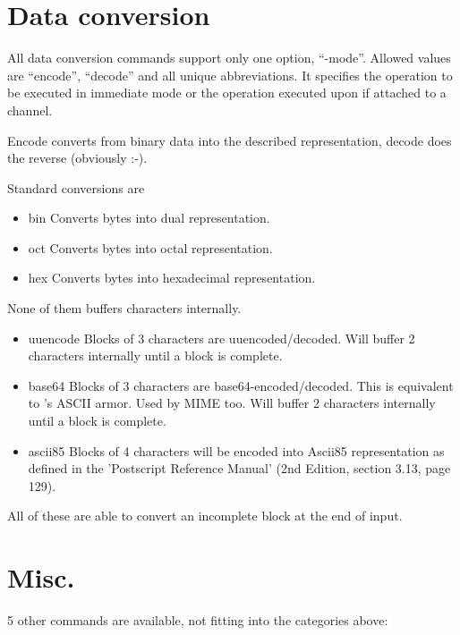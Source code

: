 \documentclass {report}
\begin{document}
\section {Data conversion}

All data conversion commands support only one option,
``-mode''. Allowed values are ``encode'', ``decode'' and all unique
abbreviations. It specifies the operation to be executed in immediate
mode or the operation executed upon  if attached to a
channel.

Encode converts from binary data into the described representation,
decode does the reverse (obviously :-).

Standard conversions are
\begin {itemize}
\item [bin]	Converts bytes into dual representation.
\item [oct]	Converts bytes into octal representation.
\item [hex]	Converts bytes into hexadecimal representation.
\end   {itemize}
None of them buffers characters internally.

\begin {itemize}
\item [uuencode] Blocks of 3 characters are uuencoded/decoded. Will
		buffer 2 characters internally until a block is complete.
\item [base64]	Blocks of 3 characters are
		base64-encoded/decoded. This is equivalent to \PGP{}'s
		ASCII armor. Used by MIME too. Will buffer 2
		characters internally until a block is complete.
\item [ascii85]	Blocks of 4 characters will be encoded into Ascii85
		representation as defined in the 'Postscript Reference
		Manual' (2nd Edition, section 3.13, page 129).
\end   {itemize}
All of these are able to convert an incomplete block at the end of
input.

\section {Misc.}

5 other commands are available, not fitting into the categories above:
\end{document}
